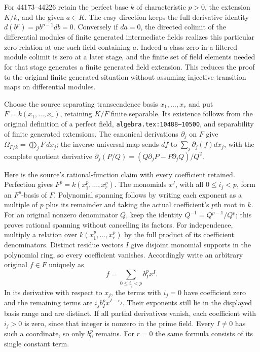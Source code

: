 For 44173--44226 retain the perfect base \(k\) of characteristic \(p>0\), the extension \(K/k\), and the given \(a\in K\). The easy direction keeps the full derivative identity \(d(b^p)=p b^{p-1}db=0\). Conversely if \(da=0\), the directed colimit of the differential modules of finite generated intermediate fields realizes this particular zero relation at one such field containing \(a\). Indeed a class zero in a filtered module colimit is zero at a later stage, and the finite set of field elements needed for that stage generates a finite generated field extension. This reduces the proof to the original finite generated situation without assuming injective transition maps on differential modules.

Choose the source separating transcendence basis \(x_1,\ldots,x_r\) and put \(F=k(x_1,\ldots,x_r)\), retaining \(K/F\) finite separable. Its existence follows from the original definition of a perfect field, \texttt{algebra.\AlgebraIdentifierBreak{}tex:\AlgebraIdentifierBreak{}10488–\AlgebraIdentifierBreak{}10500}, and separability of finite generated extensions. The canonical derivations \(\partial_j\) on \(F\) give \(\Omega_{F/k}=\bigoplus_j F\,dx_j\); the inverse universal map sends \(df\) to \(\sum_j\partial_j(f)dx_j\), with the complete quotient derivative \(\partial_j(P/Q)=(Q\partial_jP-P\partial_jQ)/Q^2\).

Here is the source's rational-function claim with every coefficient retained. Perfection gives \(F^p=k(x_1^p,\ldots,x_r^p)\). The monomials \(x^I\), with all \(0\leq i_j<p\), form an \(F^p\)-basis of \(F\). Polynomial spanning follows by writing each exponent as a multiple of \(p\) plus its remainder and taking the actual coefficient's \(p\)th root in \(k\). For an original nonzero denominator \(Q\), keep the identity \(Q^{-1}=Q^{p-1}/Q^p\); this proves rational spanning without cancelling its factors. For independence, multiply a relation over \(k(x_1^p,\ldots,x_r^p)\) by the full product of its coefficient denominators. Distinct residue vectors \(I\) give disjoint monomial supports in the polynomial ring, so every coefficient vanishes. Accordingly write an arbitrary original \(f\in F\) uniquely as \[
 f=\sum_{0\leq i_j<p} b_I^p x^I.
\] In its derivative with respect to \(x_j\), the terms with \(i_j=0\) have coefficient zero and the remaining terms are \(i_jb_I^p x^{I-e_j}\). Their exponents still lie in the displayed basis range and are distinct. If all partial derivatives vanish, each coefficient with \(i_j>0\) is zero, since that integer is nonzero in the prime field. Every \(I\ne0\) has such a coordinate, so only \(b_0^p\) remains. For \(r=0\) the same formula consists of its single constant term.

